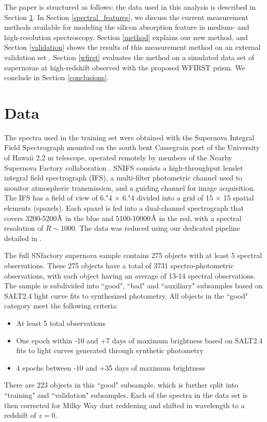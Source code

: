 The paper is structured as follows: the data used in this analysis is described in Section \ref{data}. In Section \ref{spectral_features}, we discuss the current measurement methods available for modeling the silicon absorption feature in medium- and high-resolution spectroscopy. Section \ref{method} explains our new method, and Section \ref{validation} shows the results of this measurement method on an external validation set \citep[BSNIP,][]{silverman_berkeley_2012}. Section \ref{wfirst} evaluates the method on a simulated data set of supernovae at high-redshift observed with the proposed WFIRST prism. We conclude in Section \ref{conclusions}.

\section{Data}
\label{data}
The spectra used in the training set were obtained with the Supernova Integral Field Spectrograph \citep[SNIFS,][]{lantz_snifs_2004} mounted on  the south bent Cassegrain port of the University of Hawaii 2.2 m telescope, operated remotely by members of the Nearby Supernova Factory collaboration \citep[SNfactory,][]{aldering_overview_2002}. SNIFS consists a high-throughput lenslet integral field spectrograph (IFS), a multi-filter photometric channel used to monitor atmospheric transmission, and a guiding channel for image acquisition. The IFS has a field of view of 6."4 $\times$ 6."4 divided into a grid of 15 $\times$ 15 spatial elements (spaxels). Each spaxel is fed into a dual-channel spectrograph that covers 3200-5200$\mbox{\normalfont\AA}$ in the blue and 5100-10000$\mbox{\normalfont\AA}$ in the red, with a spectral resolution of $R \sim 1000$. The data was reduced using our dedicated pipeline detailed in \cite{ponder_2020}.

The full SNfactory supernova sample contains 275 objects with at least 5 spectral observations. These 275 objects have a total of 3731 spectro-photometric observations, with each object having an average of 13-14 spectral observations. The sample is subdivided into ``good", ``bad" and ``auxiliary" subsamples based on SALT2.4 light curve fits to synthesized photometry. All objects in the ``good" category meet the following criteria:
\begin{itemize}
    \item At least 5 total observations
    \item One epoch within -10 and +7 days of maximum brightness based on SALT2.4 fits to light curves generated through synthetic photometry
    \item 4 epochs between -10 and +35 days of maximum brightness 
\end{itemize}
There are 223 objects in this ``good" subsample, which is further split into ``training" and ``validation" subsamples. Each of the spectra in the data set is then corrected for Milky Way dust reddening and shifted in wavelength to a redshift of $z=0$.

